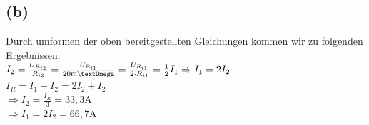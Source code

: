 \documentclass[]{article}
\newcommand{\rarr}{\Rightarrow}
\newcommand{\unit}[1]{\text{#1}}
\begin{document}
\subsection*{(b)}
	Durch umformen der oben bereitgestellten Gleichungen kommen wir zu folgenden Ergebnissen:\\
	$I_2 = \frac{U_{R_{i2}}}{R_{i2}} = \frac{U_{R_{i1}}}{20\unit{m\textOmega}} = \frac{U_{R_{i1}}}{2 \cdot R_{i1}} = \frac{1}{2}I_1 \rarr I_1 = 2I_2$\\
	$I_R = I_1 + I_2 = 2I_2 + I_2$\\
	$\rarr I_2 = \frac{I_R}{3} = 33,3\unit{A}$\\
	$\rarr I_1 = 2I_2 = 66,7\unit{A}$\\
\end{document}
